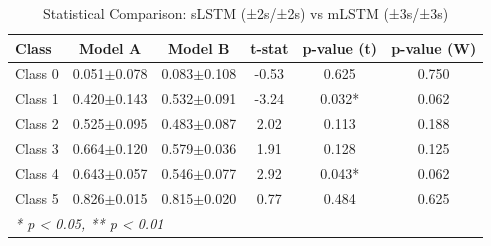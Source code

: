 \begin{table}[htbp]
\centering
\caption{Statistical Comparison: sLSTM (±2s/±2s) vs mLSTM (±3s/±3s)}
\label{tab:comparison_class_slstm_±2s_±2s_vs_mlstm_±3s_±3s}
\begin{tabular}{lccccc}
\toprule
\textbf{Class} & \textbf{Model A} & \textbf{Model B} & \textbf{t-stat} & \textbf{p-value (t)} & \textbf{p-value (W)} \\
\midrule
Class 0 & 0.051$\pm$0.078 & 0.083$\pm$0.108 & -0.53 & 0.625 & 0.750 \\
Class 1 & 0.420$\pm$0.143 & 0.532$\pm$0.091 & -3.24 & 0.032* & 0.062 \\
Class 2 & 0.525$\pm$0.095 & 0.483$\pm$0.087 & 2.02 & 0.113 & 0.188 \\
Class 3 & 0.664$\pm$0.120 & 0.579$\pm$0.036 & 1.91 & 0.128 & 0.125 \\
Class 4 & 0.643$\pm$0.057 & 0.546$\pm$0.077 & 2.92 & 0.043* & 0.062 \\
Class 5 & 0.826$\pm$0.015 & 0.815$\pm$0.020 & 0.77 & 0.484 & 0.625 \\
\bottomrule
\multicolumn{6}{l}{\textit{* p < 0.05, ** p < 0.01}} \\
\end{tabular}
\end{table}